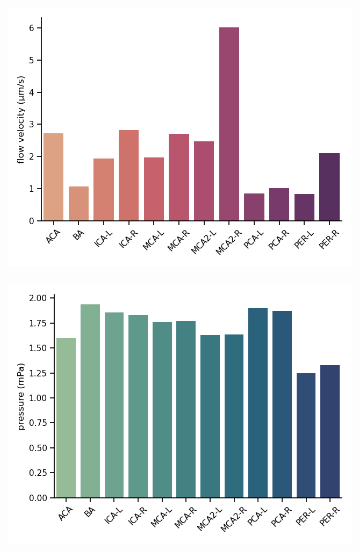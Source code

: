 \documentclass[fleqn,10pt]{wlscirep}
\begin{document}
\begin{figure}
\begin{subfigure}[b]{0.33\textwidth}
    \includegraphics[width =  \linewidth]{figures/cardiac_pvs_oscillation_arteries_labels_velocity.png}
    \end{subfigure}
    \begin{subfigure}[b]{0.33\textwidth}
    \centering
    \includegraphics[width =  \linewidth]{figures/sas_flow_arteries_labels_pressure.png}
    \end{subfigure}
         \begin{subfigure}[b]{0.33\textwidth}
    \centering

\end{subfigure}
\end{figure}
\end{document}
